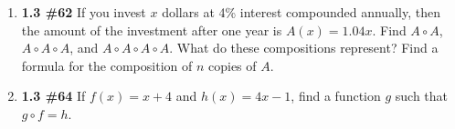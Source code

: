 \documentclass[%
]{article}
\begin{document}
\begin{enumerate}
\item {\bf 1.3 \#62} If you invest $x$ dollars at 4\% interest compounded annually, then the amount of the investment after one year is $A(x)=1.04x$.  Find $A\circ A$, $A\circ A\circ A$, and $A\circ A\circ A\circ A$.  What do these compositions represent?  Find a formula for the composition of $n$ copies of $A$.

\item {\bf 1.3 \#64} If $f(x)=x+4$ and $h(x)=4x-1$, find a function $g$ such that $g\circ f=h$.

\end{enumerate}
\end{document}

